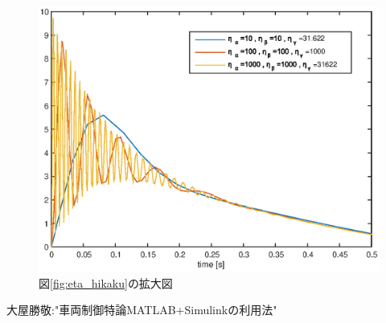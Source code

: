 \documentclass[a4paper,12pt]{jarticle}
\begin{document}
%
%
\begin{figure}[htb]
    \begin{center}
	 \includegraphics[width=140mm]{fig/eta_hikaku_k.eps}
        \caption{図\ref{fig:eta_hikaku}の拡大図}
        \label{fig:eta_hikaku_k}
    \end{center}
\end{figure}
%
%
%
%
\clearpage

\begin{thebibliography}{99}

  大屋勝敬:"車両制御特論MATLAB+Simulinkの利用法"
\end{thebibliography}
\end{document}
